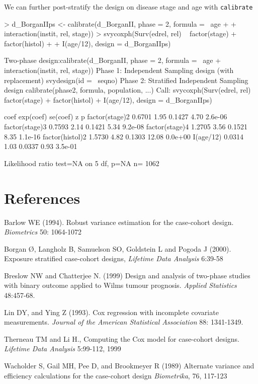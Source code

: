 \documentclass{article}
\begin{document}
We can further post-stratify the design on disease stage and age with \texttt{calibrate}
\begin{Schunk}
\begin{Sinput}
> d_BorganIIps <- calibrate(d_BorganII, phase = 2, formula = ~age + 
+     interaction(instit, rel, stage))
> svycoxph(Surv(edrel, rel) ~ factor(stage) + factor(histol) + 
+     I(age/12), design = d_BorganIIps)
\end{Sinput}
\begin{Soutput}
Two-phase design:calibrate(d_BorganII, phase = 2, formula = ~age + interaction(instit, 
    rel, stage))
Phase 1:
Independent Sampling design (with replacement)
svydesign(id = ~seqno)
Phase 2:
Stratified Independent Sampling design
calibrate(phase2, formula, population, ...)
Call:
svycoxph(Surv(edrel, rel) ~ factor(stage) + factor(histol) + 
    I(age/12), design = d_BorganIIps)


                  coef exp(coef) se(coef)     z       p
factor(stage)2  0.6701      1.95   0.1427  4.70 2.6e-06
factor(stage)3  0.7593      2.14   0.1421  5.34 9.2e-08
factor(stage)4  1.2705      3.56   0.1521  8.35 1.1e-16
factor(histol)2 1.5730      4.82   0.1303 12.08 0.0e+00
I(age/12)       0.0314      1.03   0.0337  0.93 3.5e-01

Likelihood ratio test=NA  on 5 df, p=NA  n= 1062 
\end{Soutput}
\end{Schunk}


\section*{References}

Barlow WE (1994). Robust variance estimation for the case-cohort
design. \emph{Biometrics} 50: 1064-1072

Borgan \O, Langholz B, Samuelson SO, Goldstein L and Pogoda J (2000). Exposure stratified case-cohort designs,  \emph{Lifetime Data Analysis}  6:39-58

Breslow NW and Chatterjee N. (1999) Design and analysis of two-phase
studies with binary outcome applied to Wilms tumour prognosis.  \emph{Applied
Statistics}  48:457-68.


Lin DY, and Ying Z (1993). Cox regression with incomplete covariate measurements.
\emph{Journal of the American Statistical Association} 88: 1341-1349.

Therneau TM and Li H., Computing the Cox model for case-cohort
designs. \emph{Lifetime Data Analysis} 5:99-112, 1999

Wacholder S, Gail MH, Pee D, and Brookmeyer R (1989)
Alternate variance and efficiency calculations for the case-cohort design
\emph{Biometrika}, 76, 117-123 
\end{document}

